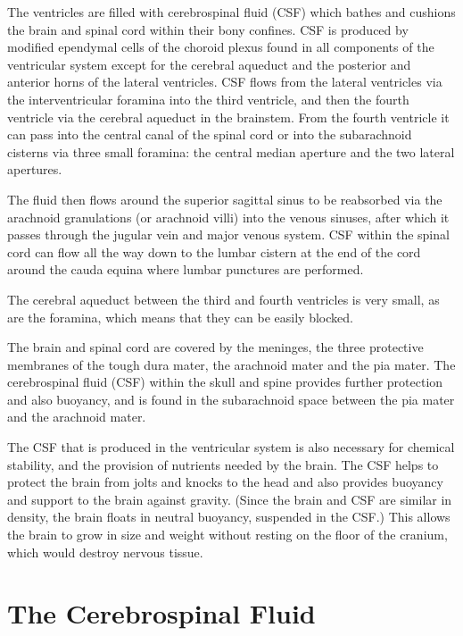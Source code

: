 The ventricles are filled with cerebrospinal fluid (CSF) which bathes and cushions the brain and spinal cord within their bony confines. CSF is produced by modified ependymal cells of the choroid plexus found in all components of the ventricular system except for the cerebral aqueduct and the posterior and anterior horns of the lateral ventricles. CSF flows from the lateral ventricles via the interventricular foramina into the third ventricle, and then the fourth ventricle via the cerebral aqueduct in the brainstem. From the fourth ventricle it can pass into the central canal of the spinal cord or into the subarachnoid cisterns via three small foramina: the central median aperture and the two lateral apertures.

The fluid then flows around the superior sagittal sinus to be reabsorbed via the arachnoid granulations (or arachnoid villi) into the venous sinuses, after which it passes through the jugular vein and major venous system. CSF within the spinal cord can flow all the way down to the lumbar cistern at the end of the cord around the cauda equina where lumbar punctures are performed.

The cerebral aqueduct between the third and fourth ventricles is very small, as are the foramina, which means that they can be easily blocked.

The brain and spinal cord are covered by the meninges, the three protective membranes of the tough dura mater, the arachnoid mater and the pia mater. The cerebrospinal fluid (CSF) within the skull and spine provides further protection and also buoyancy, and is found in the subarachnoid space between the pia mater and the arachnoid mater.

The CSF that is produced in the ventricular system is also necessary for chemical stability, and the provision of nutrients needed by the brain. The CSF helps to protect the brain from jolts and knocks to the head and also provides buoyancy and support to the brain against gravity. (Since the brain and CSF are similar in density, the brain floats in neutral buoyancy, suspended in the CSF.) This allows the brain to grow in size and weight without resting on the floor of the cranium, which would destroy nervous tissue.

\hypertarget{the-cerebrospinal-fluid}{%
\section{The Cerebrospinal Fluid}\label{the-cerebrospinal-fluid}}

